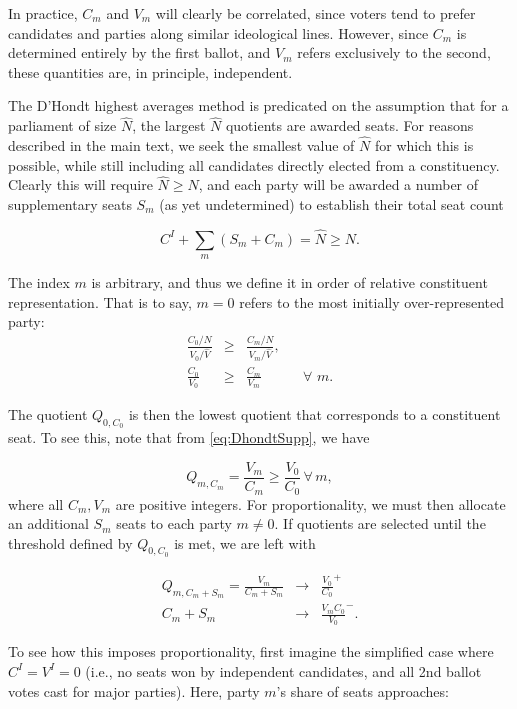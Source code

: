 In practice, $C_m$ and $V_m$ will clearly be correlated, since voters tend to prefer candidates and parties along similar ideological lines. However, since $C_m$ is determined entirely by the first ballot, and $V_m$ refers exclusively to the second, these quantities are, in principle, independent.

The D'Hondt highest averages method is predicated on the assumption that for a parliament of size $\hat{N}$, the largest $\hat{N}$ quotients are awarded seats.
For reasons described in the main text, we seek the smallest value of $\hat{N}$ for which this is possible, while still including all candidates directly elected from a constituency.
Clearly this will require $\hat{N}\ge N$, and each party will be awarded a number of supplementary seats $S_m$ (as yet undetermined) to establish their total seat count

\begin{equation}
\label{eq:sum_Sm}
C^I + \sum_m\left( S_m +C_m\right) = \hat{N} \ge N.
\end{equation}

The index $m$ is arbitrary, and thus we define it in order of relative constituent representation. That is to say, $m=0$ refers to the most initially over-represented party:
\begin{align}
\label{eq:most_overrep}
\frac{C_0/N}{V_0/\hat{V}} &\ge& \frac{C_m/N}{V_m/\hat{V}}, \\
\frac{C_0}{V_0} &\ge& \frac{C_m}{V_m} && \forall \,\, m.
\end{align}

The quotient $Q_{0,C_0}$ is then the lowest quotient that corresponds to a constituent seat. To see this, note that from \ref{eq:DhondtSupp}, we have

\begin{equation}
\label{eq:QmCm}
Q_{m,C_m} = \frac{V_m}{C_m} \ge \frac{V_0}{C_0} \,  \forall \, m,
\end{equation}
where all $C_m,V_m$ are positive integers. For proportionality, we must then allocate an additional $S_m$ seats to each party $m \neq 0$. If quotients are selected until the  threshold defined by $Q_{0,C_0}$ is met, we are left with

\begin{align}
\label{eq:QmSm}
Q_{m,C_m+S_m} = \frac{V_m}{C_m+S_m} &\to& \frac{V_0}{C_0}^+ \\
{C_m+S_m} &\to& \frac{V_mC_0}{V_0}^-.
\end{align}

To see how this imposes proportionality, first imagine the simplified case where $C^I=V^I=0$ (i.e., no seats won by independent candidates, and all 2nd ballot votes cast for major parties). Here, party $m$'s share of seats approaches:

